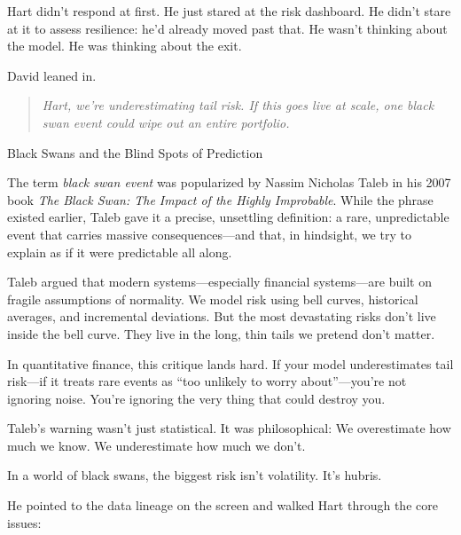 Hart didn’t respond at first.
He just stared at the risk dashboard.
He didn't stare at it to assess resilience: he’d already moved past that.
He wasn’t thinking about the model.
He was thinking about the exit.


David leaned in.

\begin{quote}
\textit{Hart, we’re underestimating tail risk. If this goes live at scale, one black swan event could wipe out an 
entire portfolio.}
\end{quote}

\medskip

\begin{HistoricalSidebar}{Black Swans and the Blind Spots of Prediction}

  The term \textit{black swan event} was popularized by Nassim Nicholas Taleb in his 2007 book \textit{The Black Swan: 
  The Impact of the Highly Improbable}. While the phrase existed earlier, Taleb gave it a precise, unsettling definition: 
  a rare, unpredictable event that carries massive consequences—and that, in hindsight, we try to explain as if it 
  were predictable all along.

  \medskip
  
  Taleb argued that modern systems—especially financial systems—are built on fragile assumptions of normality. We model 
  risk using bell curves, historical averages, and incremental deviations. But the most devastating risks don’t live 
  inside the bell curve. They live in the long, thin tails we pretend don’t matter.
  
  \medskip
  
  In quantitative finance, this critique lands hard. If your model underestimates tail risk—if it treats rare events 
  as “too unlikely to worry about”—you’re not ignoring noise. You’re ignoring the very thing that could destroy you.

  \medskip
  
  Taleb’s warning wasn’t just statistical. It was philosophical:  
  We overestimate how much we know.  
  We underestimate how much we don’t.

  \medskip
  
  In a world of black swans, the biggest risk isn’t volatility.  
  It’s hubris.
  
\end{HistoricalSidebar}

\medskip

He pointed to the data lineage on the screen and walked Hart through the core issues:

